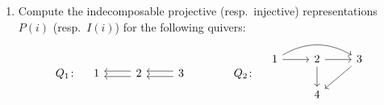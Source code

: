 \documentclass[11pt, a4paper]{article}
\begin{document}
\begin{enumerate}[leftmargin=*, label=\textbf{\arabic*.}]
\begin{proof}
    This proves that
    \[
    P(1)\simeq
    \begin{tikzcd}[ampersand replacement=\&, column sep=large, row sep=large]
    k \arrow[rr, "{\begin{bmatrix}x_1\\x_2\end{bmatrix}}"] \arrow[dr, "z"'] \& \& k^2 \arrow[r, "{\begin{bmatrix}a&b\\ c&d\end{bmatrix}}"] \& k^2 \\
    \& k \arrow[ur, "{\begin{bmatrix}y_1\\y_2\end{bmatrix}}"'] \&
    \end{tikzcd}
    \]
    if and only if all four maps have maximal rank and the two vectors
    \[
    \begin{bmatrix}a&b\\ c&d\end{bmatrix}
    \begin{bmatrix}x_1\\x_2\end{bmatrix},
    \qquad
    \begin{bmatrix}a&b\\ c&d\end{bmatrix}
    \begin{bmatrix}y_1\\y_2\end{bmatrix}
    \]
    are linearly independent.
    \end{proof}

\item Compute the indecomposable projective (resp.\ injective) representations $P(i)$ (resp.\ $I(i)$) for the following quivers:
\[
Q_1\colon\quad
\begin{tikzcd}
    1 & 2 \arrow[l, shift left] \arrow[l, shift right] & 3 \arrow[l, shift right] \arrow[l, shift left]
    \end{tikzcd}
\qquad\qquad
Q_2\colon\quad
\begin{tikzcd}
    1 \arrow[r] \arrow[rr, bend left] & 2 \arrow[r] \arrow[d] & 3 \arrow[ld] \\
                                      & 4                     &             
    \end{tikzcd}
\]


\end{enumerate}
\end{document}
